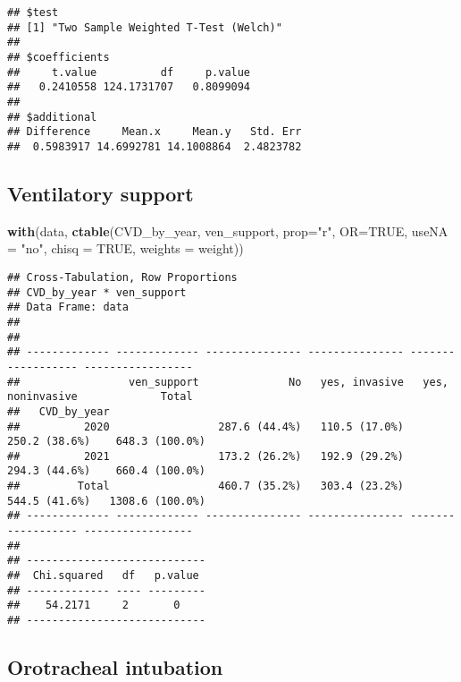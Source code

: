 \documentclass[
]{article}
\newenvironment{Shaded}{\begin{snugshade}}{\end{snugshade}}
\newcommand{\AttributeTok}[1]{\textcolor[rgb]{0.13,0.29,0.53}{#1}}
\newcommand{\ConstantTok}[1]{\textcolor[rgb]{0.56,0.35,0.01}{#1}}
\newcommand{\FunctionTok}[1]{\textcolor[rgb]{0.13,0.29,0.53}{\textbf{#1}}}
\newcommand{\NormalTok}[1]{#1}
\newcommand{\StringTok}[1]{\textcolor[rgb]{0.31,0.60,0.02}{#1}}
\begin{document}
\begin{verbatim}
## $test
## [1] "Two Sample Weighted T-Test (Welch)"
## 
## $coefficients
##     t.value          df     p.value 
##   0.2410558 124.1731707   0.8099094 
## 
## $additional
## Difference     Mean.x     Mean.y   Std. Err 
##  0.5983917 14.6992781 14.1008864  2.4823782
\end{verbatim}

\hypertarget{ventilatory-support-1}{%
\subsection{\texorpdfstring{{ Ventilatory support
}}{ Ventilatory support }}\label{ventilatory-support-1}}

\begin{Shaded}
\begin{Highlighting}[]
\FunctionTok{with}\NormalTok{(data, }\FunctionTok{ctable}\NormalTok{(CVD\_by\_year, ven\_support, }\AttributeTok{prop=}\StringTok{"r"}\NormalTok{, }\AttributeTok{OR=}\ConstantTok{TRUE}\NormalTok{, }\AttributeTok{useNA =} \StringTok{"no"}\NormalTok{, }\AttributeTok{chisq =} \ConstantTok{TRUE}\NormalTok{,  }\AttributeTok{weights =}\NormalTok{ weight))}
\end{Highlighting}
\end{Shaded}

\begin{verbatim}
## Cross-Tabulation, Row Proportions  
## CVD_by_year * ven_support  
## Data Frame: data  
## 
## 
## ------------- ------------- --------------- --------------- ------------------ -----------------
##                 ven_support              No   yes, invasive   yes, noninvasive             Total
##   CVD_by_year                                                                                   
##          2020                 287.6 (44.4%)   110.5 (17.0%)      250.2 (38.6%)    648.3 (100.0%)
##          2021                 173.2 (26.2%)   192.9 (29.2%)      294.3 (44.6%)    660.4 (100.0%)
##         Total                 460.7 (35.2%)   303.4 (23.2%)      544.5 (41.6%)   1308.6 (100.0%)
## ------------- ------------- --------------- --------------- ------------------ -----------------
## 
## ----------------------------
##  Chi.squared   df   p.value 
## ------------- ---- ---------
##    54.2171     2       0    
## ----------------------------
\end{verbatim}

\hypertarget{orotracheal-intubation-1}{%
\subsection{\texorpdfstring{{ Orotracheal intubation
}}{ Orotracheal intubation }}\label{orotracheal-intubation-1}}
\end{document}
